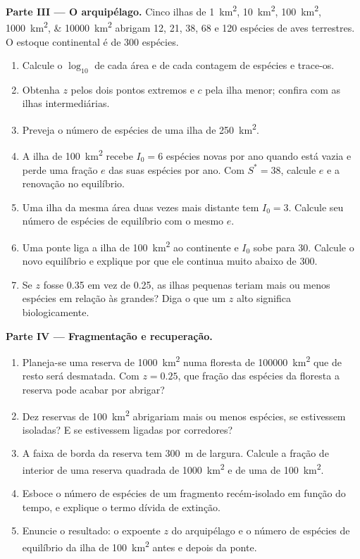 \begin{problem}
\medskip
\noindent\textbf{Parte III --- O arquipélago.}
Cinco ilhas de \qtylist{1;10;100;1000;10000}{km^2} abrigam \num{12}, \num{21}, \num{38}, \num{68} e
\num{120} espécies de aves terrestres. O estoque continental é de
\num{300} espécies.
\begin{enumerate}[resume]
  \item Calcule o $\log_{10}$ de cada área e de cada contagem de
        espécies e trace-os.
  \item Obtenha $z$ pelos dois pontos extremos e $c$ pela ilha menor;
        confira com as ilhas intermediárias.
  \item Preveja o número de espécies de uma ilha de \qty{250}{km^2}.
  \item A ilha de \qty{100}{km^2} recebe $I_0 = 6$ espécies novas por
        ano quando está vazia e perde uma fração $e$ das suas espécies
        por ano. Com $S^* = 38$, calcule $e$ e a renovação no
        equilíbrio.
  \item Uma ilha da mesma área duas vezes mais distante tem $I_0 = 3$.
        Calcule seu número de espécies de equilíbrio com o mesmo $e$.
  \item Uma ponte liga a ilha de \qty{100}{km^2} ao continente e $I_0$
        sobe para \num{30}. Calcule o novo equilíbrio e explique por
        que ele continua muito abaixo de \num{300}.
  \item Se $z$ fosse \num{0.35} em vez de \num{0.25}, as ilhas
        pequenas teriam mais ou menos espécies em relação às grandes?
        Diga o que um $z$ alto significa biologicamente.
\end{enumerate}

\medskip
\noindent\textbf{Parte IV --- Fragmentação e recuperação.}
\begin{enumerate}[resume]
  \item Planeja-se uma reserva de \qty{1000}{km^2} numa floresta de
        \qty{100000}{km^2} que de resto será desmatada. Com $z =
        0.25$, que fração das espécies da floresta a reserva pode
        acabar por abrigar?
  \item Dez reservas de \qty{100}{km^2} abrigariam mais ou menos
        espécies, se estivessem isoladas? E se estivessem ligadas por
        corredores?
  \item A faixa de borda da reserva tem \qty{300}{m} de largura.
        Calcule a fração de interior de uma reserva quadrada de
        \qty{1000}{km^2} e de uma de \qty{100}{km^2}.
  \item Esboce o número de espécies de um fragmento recém-isolado em
        função do tempo, e explique o termo dívida de extinção.
  \item Enuncie o resultado: o expoente $z$ do arquipélago e o número
        de espécies de equilíbrio da ilha de \qty{100}{km^2} antes e
        depois da ponte.
\end{enumerate}
\end{problem}

